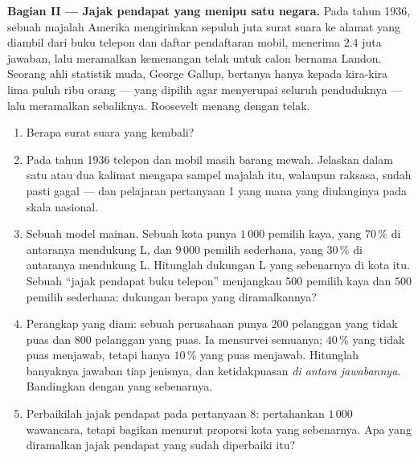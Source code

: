 \begin{problem}
\medskip
\noindent\textbf{Bagian II --- Jajak pendapat yang menipu satu negara.}
Pada tahun 1936, sebuah majalah Amerika mengirimkan sepuluh juta surat
suara ke alamat yang diambil dari buku telepon dan daftar pendaftaran
mobil, menerima $2.4$ juta jawaban, lalu meramalkan kemenangan telak
untuk calon bernama Landon. Seorang ahli statistik muda, George
Gallup, bertanya hanya kepada kira-kira lima puluh ribu orang --- yang
dipilih agar menyerupai seluruh penduduknya --- lalu meramalkan
sebaliknya. Roosevelt menang dengan telak.
\begin{enumerate}[resume]
  \item Berapa  surat suara yang kembali?
  \item Pada tahun 1936 telepon dan mobil masih barang mewah.
        Jelaskan dalam satu atau dua kalimat mengapa sampel majalah
        itu, walaupun raksasa, sudah pasti gagal --- dan pelajaran
        pertanyaan 1 yang mana yang diulanginya pada skala nasional.
  \item Sebuah model mainan. Sebuah kota punya $1\,000$ pemilih kaya,
        yang $70\,\%$ di antaranya mendukung L, dan $9\,000$ pemilih
        sederhana, yang $30\,\%$ di antaranya mendukung L. Hitunglah
        dukungan L yang sebenarnya di kota itu. Sebuah ``jajak
        pendapat buku telepon'' menjangkau $500$ pemilih kaya dan
        $500$ pemilih sederhana: dukungan berapa yang diramalkannya?
  \item Perangkap yang diam: sebuah perusahaan punya $200$ pelanggan
        yang tidak puas dan $800$ pelanggan yang puas. Ia mensurvei
        semuanya; $40\,\%$ yang tidak puas menjawab, tetapi hanya
        $10\,\%$ yang puas menjawab. Hitunglah banyaknya jawaban tiap
        jenisnya, dan  ketidakpuasan \emph{di antara
        jawabannya}. Bandingkan dengan  yang sebenarnya.
  \item Perbaikilah jajak pendapat pada pertanyaan 8: pertahankan
        $1\,000$ wawancara, tetapi bagikan menurut proporsi kota yang
        sebenarnya. Apa yang diramalkan jajak pendapat yang sudah diperbaiki itu?
\end{enumerate}


\end{problem}
